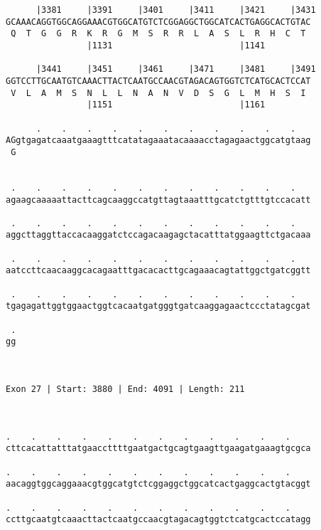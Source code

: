 \documentclass{article}
\begin{document}
\begin{Verbatim}
      |3381     |3391     |3401     |3411     |3421     |3431
GCAAACAGGTGGCAGGAAACGTGGCATGTCTCGGAGGCTGGCATCACTGAGGCACTGTAC
 Q  T  G  G  R  K  R  G  M  S  R  R  L  A  S  L  R  H  C  T 
                |1131                         |1141         
  
      |3441     |3451     |3461     |3471     |3481     |3491
GGTCCTTGCAATGTCAAACTTACTCAATGCCAACGTAGACAGTGGTCTCATGCACTCCAT
 V  L  A  M  S  N  L  L  N  A  N  V  D  S  G  L  M  H  S  I 
                |1151                         |1161         
  
      .    .    .    .    .    .    .    .    .    .    .   
AGgtgagatcaaatgaaagtttcatatagaaatacaaaacctagagaactggcatgtaag
 G                                                          
                                                            
  
 .    .    .    .    .    .    .    .    .    .    .    .   
agaagcaaaaattacttcagcaaggccatgttagtaaatttgcatctgtttgtccacatt
                                                            
 .    .    .    .    .    .    .    .    .    .    .    .   
aggcttaggttaccacaaggatctccagacaagagctacatttatggaagttctgacaaa
                                                            
 .    .    .    .    .    .    .    .    .    .    .    .   
aatccttcaacaaggcacagaatttgacacacttgcagaaacagtattggctgatcggtt
                                                            
 .    .    .    .    .    .    .    .    .    .    .    .   
tgagagattggtggaactggtcacaatgatgggtgatcaaggagaactccctatagcgat
                                                            
 .
gg
  
  
 
Exon 27 | Start: 3880 | End: 4091 | Length: 211



.    .    .    .    .    .    .    .    .    .    .    .    
cttcacattatttatgaaccttttgaatgactgcagtgaagttgaagatgaaagtgcgca
                                                            
.    .    .    .    .    .    .    .    .    .    .    .    
aacaggtggcaggaaacgtggcatgtctcggaggctggcatcactgaggcactgtacggt
                                                            
.    .    .    .    .    .    .    .    .    .    .    .    
ccttgcaatgtcaaacttactcaatgccaacgtagacagtggtctcatgcactccatagg
                                                            

\end{Verbatim}
\end{document}
